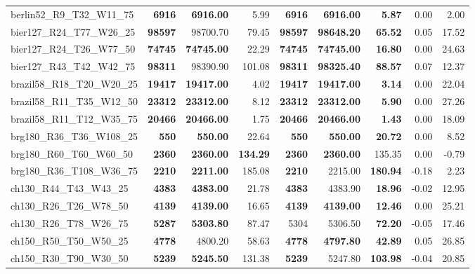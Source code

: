 \documentclass{singlecol-new}
\begin{document}
{\begin{longtable}{lrrrrrrrr}
		berlin52\_R9\_T32\_W11\_75 & \textbf{6916} & \textbf{6916.00} & 5.99 & \textbf{6916} & \textbf{6916.00} & \textbf{5.87} & 0.00 & 2.00 \\
		bier127\_R24\_T77\_W26\_25 & \textbf{98597} & 98700.70 & 79.45 & \textbf{98597} & \textbf{98648.20} & \textbf{65.52} & 0.05 & 17.52 \\
		bier127\_R24\_T26\_W77\_50 & \textbf{74745} & \textbf{74745.00} & 22.29 & \textbf{74745} & \textbf{74745.00} & \textbf{16.80} & 0.00 & 24.63 \\
		bier127\_R43\_T42\_W42\_75 & \textbf{98311} & 98390.90 & 101.08 & \textbf{98311} & \textbf{98325.40} & \textbf{88.57} & 0.07 & 12.37 \\
		brazil58\_R18\_T20\_W20\_25 & \textbf{19417} & \textbf{19417.00} & 4.02 & \textbf{19417} & \textbf{19417.00} & \textbf{3.14} & 0.00 & 22.04 \\
		brazil58\_R11\_T35\_W12\_50 & \textbf{23312} & \textbf{23312.00} & 8.12 & \textbf{23312} & \textbf{23312.00} & \textbf{5.90} & 0.00 & 27.26 \\
		brazil58\_R11\_T12\_W35\_75 & \textbf{20466} & \textbf{20466.00} & 1.75 & \textbf{20466} & \textbf{20466.00} & \textbf{1.43} & 0.00 & 18.09 \\
		brg180\_R36\_T36\_W108\_25 & \textbf{550} & \textbf{550.00} & 22.64 & \textbf{550} & \textbf{550.00} & \textbf{20.72} & 0.00 & 8.52 \\
		brg180\_R60\_T60\_W60\_50 & \textbf{2360} & \textbf{2360.00} & \textbf{134.29} & \textbf{2360} & \textbf{2360.00} & 135.35 & 0.00 & -0.79 \\
		brg180\_R36\_T108\_W36\_75 & \textbf{2210} & \textbf{2211.00} & 185.08 & \textbf{2210} & 2215.00 & \textbf{180.94} & -0.18 & 2.23 \\
		ch130\_R44\_T43\_W43\_25 & \textbf{4383} & \textbf{4383.00} & 21.78 & \textbf{4383} & 4383.90 & \textbf{18.96} & -0.02 & 12.95 \\
		ch130\_R26\_T26\_W78\_50 & \textbf{4139} & \textbf{4139.00} & 16.65 & \textbf{4139} & \textbf{4139.00} & \textbf{12.46} & 0.00 & 25.21 \\
		ch130\_R26\_T78\_W26\_75 & \textbf{5287} & \textbf{5303.80} & 87.47 & 5304 & 5306.50 & \textbf{72.20} & -0.05 & 17.46 \\
		ch150\_R50\_T50\_W50\_25 & \textbf{4778} & 4800.20 & 58.63 & \textbf{4778} & \textbf{4797.80} & \textbf{42.89} & 0.05 & 26.85 \\
		ch150\_R30\_T90\_W30\_50 & \textbf{5239} & \textbf{5245.50} & 131.38 & \textbf{5239} & 5247.80 & \textbf{103.98} & -0.04 & 20.85 \\

\end{longtable}}
\end{document}
